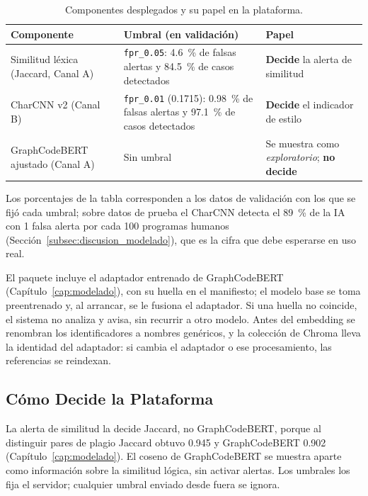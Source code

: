 \begin{table}[H]
    \centering
    \caption{Componentes desplegados y su papel en la plataforma.}
    \label{tab:desplegado}
    \renewcommand{\arraystretch}{1.25}
    \small
    \begin{tabularx}{\textwidth}{|>{\raggedright\arraybackslash}p{3.6cm}|>{\raggedright\arraybackslash}p{5.0cm}|X|}
        \hline
        \textbf{Componente} & \textbf{Umbral (en validación)} & \textbf{Papel} \\ \hline
        Similitud léxica (Jaccard, Canal A) & \texttt{fpr\_0.05}: 4.6~\% de falsas alertas y 84.5~\% de casos detectados & \textbf{Decide} la alerta de similitud \\ \hline
        CharCNN v2 (Canal B) & \texttt{fpr\_0.01} (0.1715): 0.98~\% de falsas alertas y 97.1~\% de casos detectados & \textbf{Decide} el indicador de estilo \\ \hline
        GraphCodeBERT ajustado (Canal A) & Sin umbral & Se muestra como \emph{exploratorio}; \textbf{no decide} \\ \hline
    \end{tabularx}
\end{table}

Los porcentajes de la tabla corresponden a los datos de validación con los que se fijó cada umbral; sobre datos de prueba el CharCNN detecta el 89~\% de la IA con 1 falsa alerta por cada 100 programas humanos (Sección~\ref{subsec:discusion_modelado}), que es la cifra que debe esperarse en uso real.

El paquete incluye el adaptador entrenado de GraphCodeBERT (Capítulo~\ref{cap:modelado}), con su huella en el manifiesto; el modelo base se toma preentrenado y, al arrancar, se le fusiona el adaptador. Si una huella no coincide, el sistema no analiza y avisa, sin recurrir a otro modelo. Antes del embedding se renombran los identificadores a nombres genéricos, y la colección de Chroma lleva la identidad del adaptador: si cambia el adaptador o ese procesamiento, las referencias se reindexan.

\subsection{Cómo Decide la Plataforma}
\label{subsec:decision}

La alerta de similitud la decide Jaccard, no GraphCodeBERT, porque al distinguir pares de plagio Jaccard obtuvo 0.945 y GraphCodeBERT 0.902 (Capítulo~\ref{cap:modelado}). El coseno de GraphCodeBERT se muestra aparte como información sobre la similitud lógica, sin activar alertas. Los umbrales los fija el servidor; cualquier umbral enviado desde fuera se ignora.

